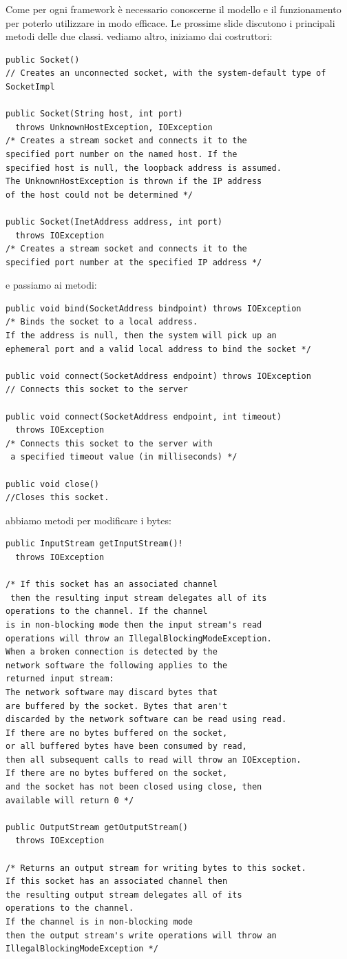 \documentclass[a4paper,12pt, oneside]{book}
\begin{document}
Come per ogni framework è necessario conoscerne il modello
e il funzionamento per poterlo utilizzare in modo efficace.
Le prossime slide discutono i principali metodi delle due classi. vediamo altro, iniziamo dai costruttori:
\begin{verbatim}
public Socket()
// Creates an unconnected socket, with the system-default type of SocketImpl

public Socket(String host, int port)
  throws UnknownHostException, IOException
/* Creates a stream socket and connects it to the 
specified port number on the named host. If the
specified host is null, the loopback address is assumed.
The UnknownHostException is thrown if the IP address 
of the host could not be determined */

public Socket(InetAddress address, int port)
  throws IOException
/* Creates a stream socket and connects it to the 
specified port number at the specified IP address */
\end{verbatim}
e passiamo ai metodi:
\begin{verbatim}
public void bind(SocketAddress bindpoint) throws IOException
/* Binds the socket to a local address.
If the address is null, then the system will pick up an
ephemeral port and a valid local address to bind the socket */

public void connect(SocketAddress endpoint) throws IOException
// Connects this socket to the server

public void connect(SocketAddress endpoint, int timeout)
  throws IOException
/* Connects this socket to the server with
 a specified timeout value (in milliseconds) */

public void close()
//Closes this socket.
\end{verbatim}
abbiamo metodi per modificare i bytes:
\begin{verbatim}
public InputStream getInputStream()!
  throws IOException
  
/* If this socket has an associated channel
 then the resulting input stream delegates all of its
operations to the channel. If the channel 
is in non-blocking mode then the input stream's read
operations will throw an IllegalBlockingModeException.
When a broken connection is detected by the 
network software the following applies to the
returned input stream:
The network software may discard bytes that 
are buffered by the socket. Bytes that aren't
discarded by the network software can be read using read.
If there are no bytes buffered on the socket, 
or all buffered bytes have been consumed by read,
then all subsequent calls to read will throw an IOException.
If there are no bytes buffered on the socket, 
and the socket has not been closed using close, then
available will return 0 */ 

public OutputStream getOutputStream()
  throws IOException
  
/* Returns an output stream for writing bytes to this socket.
If this socket has an associated channel then 
the resulting output stream delegates all of its
operations to the channel.
If the channel is in non-blocking mode 
then the output stream's write operations will throw an
IllegalBlockingModeException */
\end{verbatim}
\end{document}

